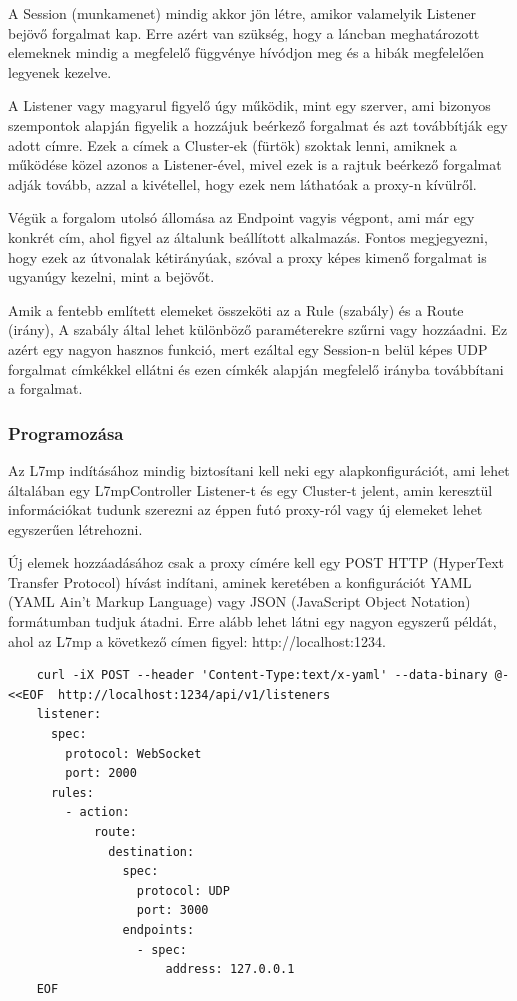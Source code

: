 A Session (munkamenet) mindig akkor jön létre, amikor valamelyik Listener 
bejövő forgalmat kap. Erre azért van szükség, hogy a láncban meghatározott 
elemeknek mindig a megfelelő függvénye hívódjon meg és a hibák megfelelően 
legyenek kezelve. 

A Listener vagy magyarul figyelő úgy működik, mint egy szerver, ami bizonyos 
szempontok alapján figyelik a hozzájuk beérkező forgalmat és azt továbbítják
egy adott címre. Ezek a címek a Cluster-ek (fürtök) szoktak lenni, amiknek a 
működése közel azonos a Listener-ével, mivel ezek is a rajtuk beérkező forgalmat
adják tovább, azzal a kivétellel, hogy ezek nem láthatóak a proxy-n kívülről.

Végük a forgalom utolsó állomása az Endpoint vagyis végpont, ami már egy konkrét
cím, ahol figyel az általunk beállított alkalmazás. Fontos megjegyezni, hogy 
ezek az útvonalak kétirányúak, szóval a proxy képes kimenő forgalmat is ugyanúgy 
kezelni, mint a bejövőt. 

Amik a fentebb említett elemeket összeköti az a Rule (szabály) és a Route (irány),
A szabály által lehet különböző paraméterekre szűrni vagy hozzáadni. Ez azért egy 
nagyon hasznos funkció, mert ezáltal egy Session-n belül képes UDP forgalmat 
címkékkel ellátni és ezen címkék alapján megfelelő irányba továbbítani a 
forgalmat.

\subsubsection{Programozása}

Az L7mp indításához mindig biztosítani kell neki egy alapkonfigurációt, ami 
lehet általában egy L7mpController Listener-t és egy Cluster-t jelent, amin 
keresztül információkat tudunk szerezni az éppen futó proxy-ról vagy új 
elemeket lehet egyszerűen létrehozni. 

Új elemek hozzáadásához csak a proxy címére kell egy POST HTTP (HyperText Transfer 
Protocol) hívást indítani, aminek keretében a konfigurációt YAML (YAML Ain't Markup 
Language) vagy JSON (JavaScript Object Notation) formátumban tudjuk átadni.
Erre alább lehet látni egy nagyon egyszerű példát, ahol az L7mp a következő címen 
figyel: http://localhost:1234. 

\begin{lstlisting}
	curl -iX POST --header 'Content-Type:text/x-yaml' --data-binary @- <<EOF  http://localhost:1234/api/v1/listeners
	listener:
	  spec:
	    protocol: WebSocket
	    port: 2000
	  rules:
	    - action:
	        route:
	          destination:
	            spec:
  	              protocol: UDP
	              port: 3000
	            endpoints:
	              - spec:
	                  address: 127.0.0.1
	EOF
\end{lstlisting}

